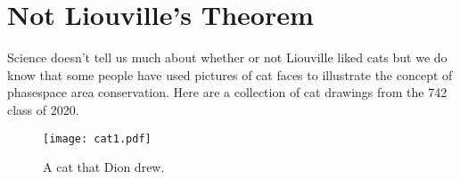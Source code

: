 \section{Not Liouville's Theorem}
Science doesn't tell us much about whether or not Liouville liked cats but we do know that some people have used pictures of cat faces to illustrate the concept of phasespace area conservation. 
Here are a collection of cat drawings from the 742 class of 2020.

\begin{centering}
\begin{figure}
	\texttt{[image: cat1.pdf]}
  \caption{A cat that Dion drew.}
  \label{fig:cat1}
\end{figure}
\end{centering}



\clearpage
